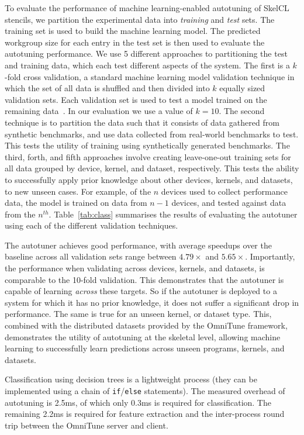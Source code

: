 \documentclass[nonatbib,preprint,9pt]{sigplanconf}
\begin{document}
To evaluate the performance of machine learning-enabled autotuning of
SkelCL stencils, we partition the experimental data into
\emph{training} and \emph{test} sets. The training set is used to
build the machine learning model. The predicted workgroup size for
each entry in the test set is then used to evaluate the autotuning
performance. We use 5 different approaches to partitioning the test
and training data, which each test different aspects of the
system. The first is a $k$-fold cross validation, a standard machine
learning model validation technique in which the set of all data is
shuffled and then divided into $k$ equally sized validation sets. Each
validation set is used to test a model trained on the remaining
data~\cite{Han2011}. In our evaluation we use a value of $k=10$. The
second technique is to partition the data such that it consists of
data gathered from synthetic benchmarks, and use data collected from
real-world benchmarks to test. This tests the utility of training
using synthetically generated benchmarks. The third, forth, and fifth
approaches involve creating leave-one-out training sets for all data
grouped by device, kernel, and dataset, respectively. This tests the
ability to successfully apply prior knowledge about other devices,
kernels, and datasets, to new unseen cases. For example, of the $n$
devices used to collect performance data, the model is trained on data
from $n-1$ devices, and tested against data from the
$n^{th}$. Table~\ref{tab:class} summarises the results of evaluating
the autotuner using each of the different validation techniques.

The autotuner achieves good performance, with average speedups over
the baseline across all validation sets range between $4.79\times$ and
$5.65\times$. Importantly, the performance when validating across
devices, kernels, and datasets, is comparable to the 10-fold
validation. This demonstrates that the autotuner is capable of
learning \emph{across} these targets. So if the autotuner is deployed
to a system for which it has no prior knowledge, it does not suffer a
significant drop in performance. The same is true for an unseen
kernel, or dataset type. This, combined with the distributed datasets
provided by the OmniTune framework, demonstrates the utility of
autotuning at the skeletal level, allowing machine learning to
successfully learn predictions across unseen programs, kernels, and
datasets.

Classification using decision trees is a lightweight process (they can
be implemented using a chain of \texttt{if}/\texttt{else} statements).
The measured overhead of autotuning is 2.5ms, of which only 0.3ms is
required for classification. The remaining 2.2ms is required for
feature extraction and the inter-process round trip between the
OmniTune server and client.
\end{document}
